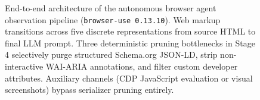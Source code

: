 \begin{figure}[t]
{%
}
\caption{End-to-end architecture of the autonomous browser agent observation pipeline (\texttt{browser-use 0.13.10}). Web markup transitions across five discrete representations from source HTML to final LLM prompt. Three deterministic pruning bottlenecks in Stage 4 selectively purge structured Schema.org JSON-LD, strip non-interactive WAI-ARIA annotations, and filter custom developer attributes. Auxiliary channels (CDP JavaScript evaluation or visual screenshots) bypass serializer pruning entirely.}
\label{fig:pipeline_architecture}
\end{figure}
